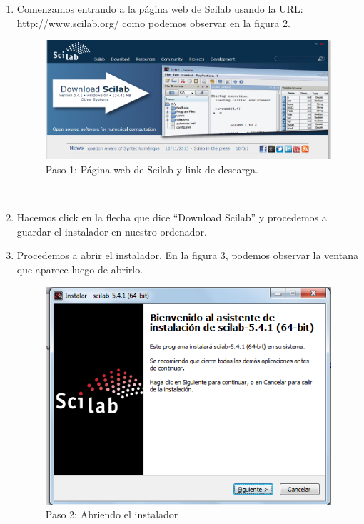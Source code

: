 \documentclass[11pt]{article} %
\begin{document}
\begin{enumerate}
\item Comenzamos entrando a la página web de Scilab usando la URL: http://www.scilab.org/ como podemos observar en la figura 2.
\\%
\begin{figure}[!h]
  \centering
    \includegraphics[scale=0.5]{Captura1}
  \caption{Paso 1: Página web de Scilab y link de descarga.}
  \label{fig:paso1}
\end{figure}
\\%

\item Hacemos click en la flecha que dice “Download Scilab” y procedemos a guardar el instalador en nuestro ordenador.
\\%

\item Procedemos a abrir el instalador. En la figura 3, podemos observar la ventana que aparece luego de abrirlo.
\\%
\begin{figure}[!h]
  \centering
    \includegraphics[scale=0.5]{Captura2}
  \caption{Paso 2: Abriendo el instalador}
  \label{fig:paso2}
\end{figure}
\\%


\end{enumerate}
\end{document}
